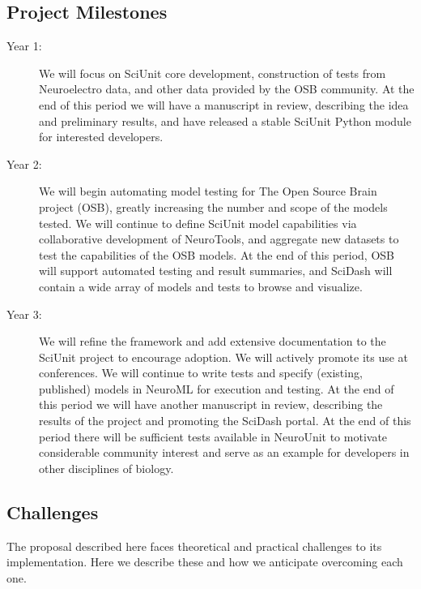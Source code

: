 \documentclass[a4paper,12pt]{article}
\begin{document}
\subsection{Project Milestones}
\begin{description}
\item[Year 1:] We will focus on SciUnit core development, construction of tests from Neuroelectro data, and other data provided by the OSB community.  At the end of this period we will have a manuscript in review, describing the idea and preliminary results, and have released a stable SciUnit Python module for interested developers. 
\item[Year 2:] We will begin automating model testing for The Open Source Brain project (OSB), greatly increasing the number and scope of the models tested.  We will continue to define SciUnit model capabilities via collaborative development of NeuroTools, and aggregate new datasets to test the capabilities of the OSB models.  At the end of this period, OSB will support automated testing and result summaries, and SciDash will contain a wide array of models and tests to browse and visualize.  
\item[Year 3:] We will refine the framework and add extensive documentation to the SciUnit project to encourage adoption.  We will actively promote its use at conferences.  We will continue to write tests and specify (existing, published) models in NeuroML for execution and testing. At the end of this period we will have another manuscript in review, describing the results of the project and promoting the SciDash portal.  At the end of this period there will be sufficient tests available in NeuroUnit to motivate considerable community interest and serve as an example for developers in other disciplines of biology.  
\end{description}

\subsection{Challenges}
The proposal described here faces theoretical and practical challenges to its implementation.  Here we describe these and how we anticipate overcoming each one.
\end{document}
